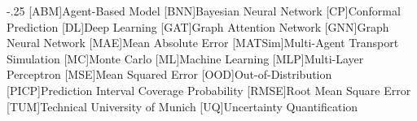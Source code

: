 \documentclass[headsepline,footsepline,footinclude=false,fontsize=11pt,paper=a4,listof=totoc,bibliography=totoc,BCOR=12mm,DIV=12,openany]{scrbook}
\theoremstyle{definition}
\theoremstyle{plain}
\begin{document}
\raggedbottom

\let\cleardoublepage\clearpage
\let\cleardoubleoddpage\clearpage
\let\cleardoubleevenpage\clearpage



\frontmatter{}







\tableofcontents{}

\mainmatter{}









\appendix{}


\begin{acronym}
	\itemsep-.25\baselineskip
	[ABM]{Agent-Based Model}
	[BNN]{Bayesian Neural Network}
	[CP]{Conformal Prediction}
	[DL]{Deep Learning}
	[GAT]{Graph Attention Network}
	[GNN]{Graph Neural Network}
	[MAE]{Mean Absolute Error}
	[MATSim]{Multi-Agent Transport Simulation}
	[MC]{Monte Carlo}
	[ML]{Machine Learning}
	[MLP]{Multi-Layer Perceptron}
	[MSE]{Mean Squared Error}
	[OOD]{Out-of-Distribution}
	[PICP]{Prediction Interval Coverage Probability}
	[RMSE]{Root Mean Square Error}
	[TUM]{Technical University of Munich}
	[UQ]{Uncertainty Quantification}
\end{acronym}

\listoffigures{}
\listoftables{}
\listofalgorithms{}
\printbibliography{}
\end{document}
